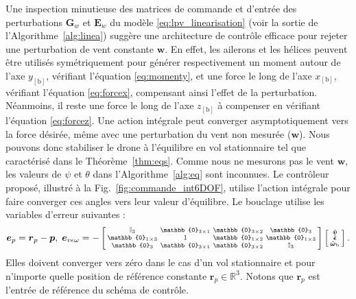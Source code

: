 Une inspection minutieuse des matrices de commande et d'entrée des perturbations $\boldsymbol{G}_{w}$ et $\boldsymbol{E}_{w}$ du modèle \eqref{eq:lpv_linearisation} (voir la sortie de l'Algorithme~\ref{alg:linea}) suggère une architecture de contrôle efficace pour rejeter une perturbation de vent constante $\boldsymbol{w}$. En effet, les ailerons et les hélices peuvent être utilisés symétriquement pour générer respectivement un moment autour de l'axe $y_{[\text{b}]}$, vérifiant l'équation \eqref{eq:momenty}, et une force le long de l'axe $x_{[\text{b}]}$, vérifiant l'équation \eqref{eq:forcex}, compensant ainsi l'effet de la perturbation. Néanmoins, il reste une force le long de l'axe $z_{[\text{b}]}$ à compenser en vérifiant l'équation \eqref{eq:forcez}. Une action intégrale peut converger asymptotiquement vers la force désirée, même avec une perturbation du vent non mesurée ($\boldsymbol{w}$). Nous pouvons donc stabiliser le drone à l'équilibre en vol stationnaire tel que caractérisé dans le Théorème~\ref{thm:eqs}. Comme nous ne mesurons pas le vent $\boldsymbol{w}$, les valeurs de $\psi$ et $\theta$ dans l'Algorithme~\ref{alg:eq} sont inconnues. Le contrôleur proposé, illustré à la Fig.~\ref{fig:commande_int6DOF}, utilise l'action intégrale pour faire converger ces angles vers leur valeur d'équilibre. Le bouclage utilise les variables d'erreur suivantes : 
\begin{align}
    \boldsymbol{e}_{p}= \boldsymbol{r}_{p} - \boldsymbol{p}, \; \boldsymbol{e}_{v \epsilon \omega} = -  
       \left[ \begin{smallmatrix} \mathbb{I}_{3}  & \mathbb{0}_{3\times 1} & \mathbb{0}_{3\times 2} & \mathbb{0}_{3}\\
       \mathbb{0}_{1\times 3}  & 1 & \mathbb{0}_{1\times 2} & \mathbb{0}_{1 \times 3} \\
           \mathbb{0}_{3}  & \mathbb{0}_{3\times 1} & \mathbb{0}_{3\times 2} &   \mathbb{I}_{3}
           \end{smallmatrix} \right]
    \smallmat{
           \tilde{\boldsymbol{v}} \\
           \tilde{\boldsymbol{\epsilon}} \\
           \tilde{\boldsymbol{\omega}}_{\text{b}} 
    }.
  \label{eq:error_var}
\end{align} 
Elles doivent converger vers zéro dans le cas d'un vol stationnaire et pour n'importe quelle position de référence constante $\boldsymbol{r}_{p} \in \mathbb{R}^{3}$. Notons que $\boldsymbol{r}_{p}$ est l'entrée de référence du schéma de contrôle.

